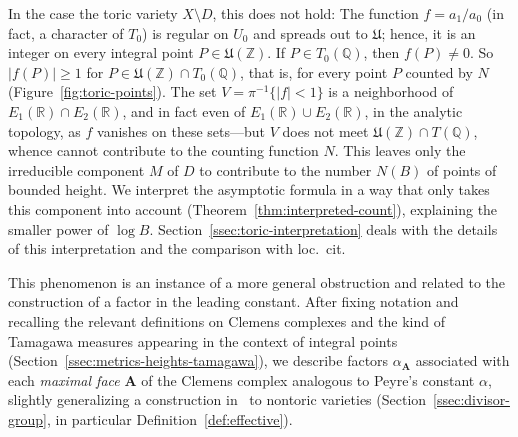 \documentclass[a4paper, twoside, 10pt]{amsart}
\newcommand{\uA}{{\boldsymbol{A}}}
\newcommand{\mU}{\mathfrak{U}}
\newcommand{\RR}{\mathbb{R}}
\newcommand{\ZZ}{\mathbb{Z}}
\newcommand{\QQ}{\mathbb{Q}}
\newcommand{\abs}[1]{\left\lvert#1\right\rvert}
\theoremstyle{definition}
\begin{document}
In the case the toric variety $X\setminus D$, this does not hold: The function $f = a_1/a_0$ (in fact, a character of $T_0$) is regular on $U_0$ and spreads out to $\mU$; hence, it is an integer on every integral point $P\in\mU(\ZZ)$. If $P\in T_0(\QQ)$, then $f(P) \ne 0$. So $\abs{f(P)}\ge 1$ for $P\in \mU(\ZZ) \cap T_0(\QQ)$, that is, for every point $P$ counted by $N$ (Figure~\ref{fig:toric-points}).
The set $V=\pi^{-1}\{\abs{f} < 1\}$ is a neighborhood of $E_1(\RR) \cap E_2(\RR)$, and in fact even of $E_1(\RR)\cup E_2(\RR)$, in the analytic topology, as $f$ vanishes on these sets---but $V$ does not meet $\mU(\ZZ) \cap T(\QQ)$, whence cannot contribute to the counting function $N$. This leaves only the irreducible component $M$ of $D$ to contribute to the number $N(B)$ of points of bounded height. We interpret the asymptotic formula in a way that only takes this component into account (Theorem~\ref{thm:interpreted-count}), explaining the smaller power of $\log B$. Section~\ref{ssec:toric-interpretation} deals with the details of this interpretation and the comparison with loc.~cit.

\medskip

This phenomenon is an instance of a more general obstruction and related to the construction of a factor in the leading constant. 
After fixing notation and recalling the relevant definitions on Clemens complexes and the kind of Tamagawa measures appearing in the context of integral points (Section~\ref{ssec:metrics-heights-tamagawa}), we describe factors $\alpha_\uA$ associated with each \emph{maximal face} $\uA$ of the Clemens complex analogous to Peyre's constant $\alpha$, slightly generalizing a construction in~\cite{arXiv:1006.3345} to nontoric varieties (Section~\ref{ssec:divisor-group}, in particular Definition~\ref{def:effective}).
\end{document}
